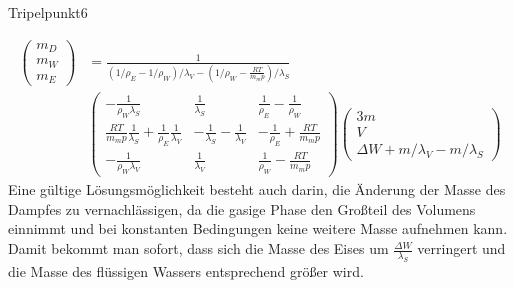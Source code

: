 \begin{problem}{Tripelpunkt}{6}
\begin{solution}
\[\begin{split}
\begin{pmatrix}
m_D \\ m_W \\ m_E
\end{pmatrix}
&=
\frac{1}{(1/\rho_E - 1/\rho_W) / \lambda_V - (1/\rho_W - \frac{RT}{m_m p}) / \lambda_S}\\
&\begin{pmatrix}
-\frac{1}{\rho_W \lambda_S} & \frac{1}{\lambda_S} & \frac{1}{\rho_E} - \frac{1}{\rho_W} \\
\frac{RT}{m_m p} \frac{1}{\lambda_S}+\frac{1}{\rho_E}\frac{1}{\lambda_V}  & -\frac{1}{\lambda_S}-\frac{1}{\lambda_V} & -\frac{1}{\rho_E}+\frac{RT}{m_m p} \\
-\frac{1}{\rho_W \lambda_V} & \frac{1}{\lambda_V} & \frac{1}{\rho_W}-\frac{RT}{m_m p}
\end{pmatrix}
\begin{pmatrix}
3m \\ V \\ \Delta W + m / \lambda_V - m / \lambda_S
\end{pmatrix}
\end{split}
\]
Eine gültige Lösungsmöglichkeit besteht auch darin, die Änderung der Masse des Dampfes zu vernachlässigen, da die gasige Phase den Großteil des Volumens einnimmt und bei konstanten Bedingungen keine weitere Masse aufnehmen kann. Damit bekommt man sofort, dass sich die Masse des Eises um $\frac{\Delta W}{\lambda_S}$ verringert und die Masse des flüssigen Wassers entsprechend größer wird.
\end{solution}
\end{problem}

